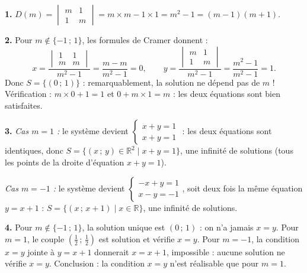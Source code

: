 \documentclass[11pt]{article}
\begin{document}
\begin{corrige}[Exercice 1]
\textbf{1.} $D(m) = \begin{vmatrix} m & 1 \\ 1 & m \end{vmatrix} = m\times m - 1\times 1 = m^2 - 1 = (m-1)(m+1)$.

\textbf{2.} Pour $m \notin \{-1\,;\,1\}$, les formules de Cramer donnent :
\[
x = \frac{\begin{vmatrix} 1 & 1 \\ m & m \end{vmatrix}}{m^2-1} = \frac{m - m}{m^2-1} = 0, \qquad
y = \frac{\begin{vmatrix} m & 1 \\ 1 & m \end{vmatrix}}{m^2-1} = \frac{m^2 - 1}{m^2 - 1} = 1.
\]
Donc $S = \{(0\,;\,1)\}$ : remarquablement, la solution ne dépend pas de $m$ ! Vérification : $m\times 0 + 1 = 1$ et $0 + m\times 1 = m$ : les deux équations sont bien satisfaites.

\textbf{3.} \emph{Cas $m = 1$ :} le système devient $\begin{cases} x + y = 1 \\ x + y = 1 \end{cases}$ : les deux équations sont identiques, donc $S = \{(x\,;\,y) \in \mathbb{R}^2 \mid x + y = 1\}$, une infinité de solutions (tous les points de la droite d'équation $x + y = 1$).

\emph{Cas $m = -1$ :} le système devient $\begin{cases} -x + y = 1 \\ x - y = -1 \end{cases}$, soit deux fois la même équation $y = x + 1$ : $S = \{(x\,;\,x+1) \mid x \in \mathbb{R}\}$, une infinité de solutions.

\textbf{4.} Pour $m \notin \{-1\,;\,1\}$, la solution unique est $(0\,;\,1)$ : on n'a jamais $x = y$. Pour $m = 1$, le couple $\left(\tfrac12\,;\,\tfrac12\right)$ est solution et vérifie $x = y$. Pour $m = -1$, la condition $x = y$ jointe à $y = x + 1$ donnerait $x = x + 1$, impossible : aucune solution ne vérifie $x = y$. Conclusion : la condition $x = y$ n'est réalisable que pour $m = 1$.
\end{corrige}
\end{document}
